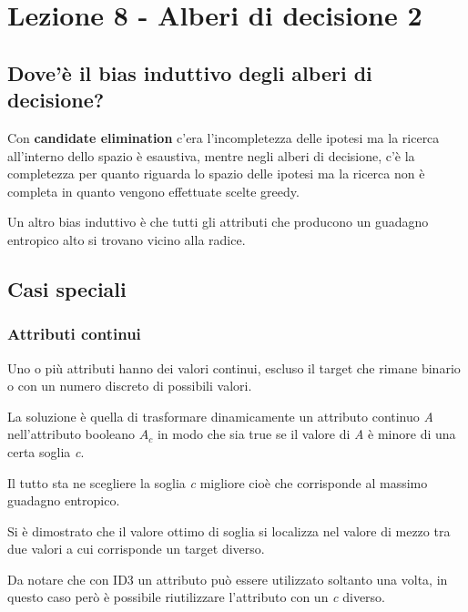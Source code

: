 \section{Lezione 8 - Alberi di decisione 2}\label{lezione-8---alberi-di-decisione-2}

\subsection{Dove'è il bias induttivo degli alberi di decisione?}\label{doveuxe8-il-bias-induttivo-degli-alberi-di-decisione}

Con \textbf{candidate elimination} c'era l'incompletezza delle ipotesi
ma la ricerca all'interno dello spazio è esaustiva, mentre negli alberi
di decisione, c'è la completezza per quanto riguarda lo spazio delle
ipotesi ma la ricerca non è completa in quanto vengono effettuate scelte
greedy.

Un altro bias induttivo è che tutti gli attributi che producono un
guadagno entropico alto si trovano vicino alla radice.

\subsection{Casi speciali}\label{casi-speciali}

\subsubsection{Attributi continui}\label{attributi-continui}

Uno o più attributi hanno dei valori continui, escluso il target che
rimane binario o con un numero discreto di possibili valori.

La soluzione è quella di trasformare dinamicamente un attributo continuo
\emph{A} nell'attributo booleano $A_c$ in modo che sia true se il
valore di \emph{A} è minore di una certa soglia \emph{c}.

Il tutto sta ne scegliere la soglia \emph{c} migliore cioè che
corrisponde al massimo guadagno entropico.

Si è dimostrato che il valore ottimo di soglia si localizza nel valore
di mezzo tra due valori a cui corrisponde un target diverso.

Da notare che con ID3 un attributo può essere utilizzato soltanto una
volta, in questo caso però è possibile riutilizzare l'attributo con un
\emph{c} diverso.

